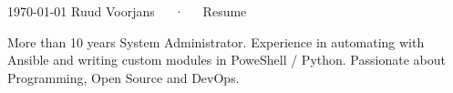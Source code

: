 \documentclass[11pt, letterpaper]{awesome-cv}
\begin{document}
\makecvheader[C]

\makecvfooter
  {\today}
  {Ruud Voorjans~~~·~~~Resume}
  {\thepage}

\begin{cvparagraph}

More than 10 years System Administrator. Experience in automating with Ansible and writing custom modules in PoweShell / Python. Passionate about Programming, Open Source and DevOps.


\end{cvparagraph}

\end{document}

